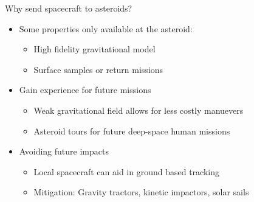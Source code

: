 \begin{frame}[t]{Why send spacecraft to asteroids?}
    \begin{itemize}
        \item<1-> Some properties only available at the asteroid:
            \begin{itemize}
                \item High fidelity gravitational model
                \item Surface samples or return missions
            \end{itemize}
        \item<2-> Gain experience for future missions
            \begin{itemize}
                \item Weak gravitational field allows for less costly manuevers
                \item Asteroid tours for future deep-space human missions
            \end{itemize}
        \item<3-> Avoiding future impacts
            \begin{itemize}
                \item Local spacecraft can aid in ground based tracking
                \item Mitigation: Gravity tractors, kinetic impactors, solar sails
            \end{itemize}
    \end{itemize}

\end{frame}
